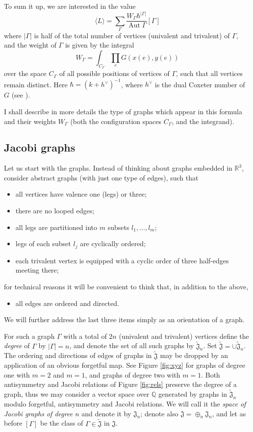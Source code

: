 \documentclass[10pt]{amsart}
\theoremstyle{definition}
\theoremstyle{remark}
\newcommand{\Q}{\mathbb Q}
\newcommand{\R}{\mathbb R}
\newcommand{\bJ}{\widetilde{\mathfrak{J}}}
\newcommand{\J}{\mathfrak{J}}
\def\<{\langle}
\def\>{\rangle}
\newcommand{\h}{\hbar}
\newcommand{\GG}{\Gamma}
\newcommand{\Aut}{\operatorname{Aut}}
\begin{document}
To sum it up, we are interested in the value
\begin{equation}\label{eq:L}
\<L\>=\sum_\GG\frac{W_\GG\h^{|\GG|}}{\Aut\GG}[\GG]
\end{equation}
where $|\GG|$ is half of the total number of vertices (univalent
and trivalent) of $\GG$,
and the weight of $\GG$ is
given by the integral
\begin{equation}\label{eq:W}
W_\GG=\int_{C_\GG}\prod_e G(x(e),y(e))
\end{equation}
over the space $C_\GG$ of all possible positions of vertices of
$\GG$, such that all vertices remain distinct.
Here $\h=(k+h^\vee)^{-1}$, where $h^\vee$ is the dual Coxeter number of $G$
(see \cite{W}).


I shall describe in more details the type of graphs which appear
in this formula and their weights $W_\GG$ (both the
configuration spaces $C_\GG$, and the integrand).

\subsection{Jacobi graphs}
Let us start with the graphs. Instead of thinking about graphs
embedded in $\R^3$, consider abstract graphs (with just one type
of edges), such that
\begin{itemize}
\item all vertices have valence one (legs) or three;
\item there are no looped edges;
\item all legs are partitioned into $m$ subsets $l_1,\dots,l_m$;
\item legs of each subset $l_j$ are cyclically ordered;
\item each trivalent vertex is equipped with a cyclic order of
three half-edges meeting there;
\end{itemize}
for technical reasons it will be convenient to think that, in
addition to the above,
\begin{itemize}
\item all edges are ordered and directed.
\end{itemize}
We will further address the last three items simply as an
orientation of a graph.

For such a graph $\GG$ with a total of $2n$ (univalent and
trivalent) vertices define the {\em degree} of $\GG$ by $|\GG|=n$,
and denote the set of all such graphs by $\bJ_n$. Set
$\bJ=\cup\bJ_n$. The ordering and directions of edges of
graphs in $\bJ$ may be dropped by an application of an obvious
forgetful map. See Figure \ref{fig:xyz} for graphs of
degree one with $m=2$ and $m=1$, and graphs of degree two with $m=1$.
Both antisymmetry and Jacobi relations of Figure \ref{fig:rels}
preserve the degree of a graph, thus we may consider a vector
space over $\Q$ generated by graphs in $\bJ_n$ modulo forgetful,
antisymmetry and Jacobi relations. We will call it the {\em space
of Jacobi graphs of degree $n$} and denote it by $\J_n$; denote
also $\J=\oplus_n\J_n$, and let as before $[\GG]$ be the class of
$\GG\in\bJ$ in $\J$.
\end{document}
